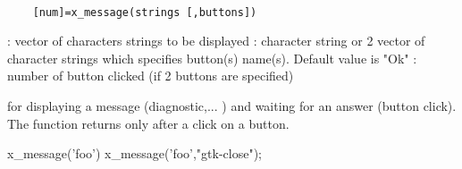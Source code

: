 \begin{mandesc}
  \\ %
\end{mandesc}
\label{x-message}
\begin{calling_sequence}
  \begin{verbatim}
    [num]=x_message(strings [,buttons])   
  \end{verbatim}
\end{calling_sequence}
\begin{parameters}
  \begin{varlist}
     : vector of characters strings to be displayed
     : character string or 2 vector of character strings which specifies button(s) name(s). Default value is "Ok"
     : number  of button clicked (if 2 buttons are specified)
  \end{varlist}
\end{parameters}
\begin{mandescription}
  for displaying a message (diagnostic,... ) and waiting for
  an answer (button click). The function returns only after a click on a
  button.
\end{mandescription}
\begin{examples}
  \begin{program}
    x_message('foo')
    x_message('foo',"gtk-close");
  \end{program}
\end{examples}
\begin{manseealso}
      
\end{manseealso}

